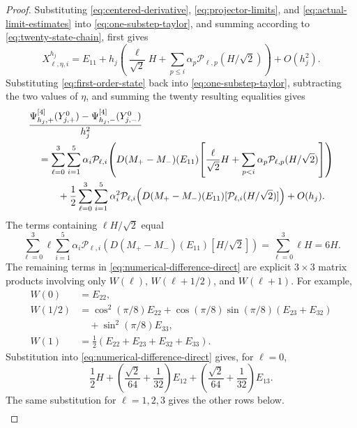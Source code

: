 \documentclass[10pt,a4paper]{amsart}
\numberwithin{equation}{section}
\begin{document}
\begin{proof}
Substituting \eqref{eq:centered-derivative},
\eqref{eq:projector-limits}, and \eqref{eq:actual-limit-estimates} into
\eqref{eq:one-substep-taylor}, and summing according to
\eqref{eq:twenty-state-chain}, first gives
\begin{equation}\label{eq:first-order-state}
 X^{h_j}_{\ell,\eta,i}
 =E_{11}+h_j\left(
 \frac{\ell}{\sqrt2}H
 +\sum_{p\le i}\alpha_p\mathcal P_{\ell,p}(H/\sqrt2)
 \right)+O(h_j^2).
\end{equation}
Substituting \eqref{eq:first-order-state} back into
\eqref{eq:one-substep-taylor}, subtracting the two values of $\eta$,
and summing the twenty resulting equalities gives
\begin{align}
 &\frac{\Psi^{[4]}_{h_j,+}(Y_{j,+}^0)-\Psi^{[4]}_{h_j,-}(Y_{j,-}^0)}{h_j^2}
 \notag\\
 &\quad=
 \sum_{\ell=0}^3\sum_{i=1}^5
 \alpha_i\mathcal P_{\ell,i}\!\left(
 D(M_+-M_-)(E_{11})\!\left[
 \frac{\ell}{\sqrt2}H
 +
   \sum_{p<i}\alpha_p\mathcal P_{\ell,p}(H/\sqrt2)
 \right]\right)
 \notag\\
 &\qquad\quad+\frac12
 \sum_{\ell=0}^3\sum_{i=1}^5\alpha_i^2
 \mathcal P_{\ell,i}\!\left(
 D(M_+-M_-)(E_{11})
 [\mathcal P_{\ell,i}(H/\sqrt2)]\right)+O(h_j).
 \label{eq:numerical-difference-direct}
\end{align}
The terms containing $\ell H/\sqrt2$ equal
\begin{equation}\label{eq:previous-step-sum}
 \sum_{\ell=0}^3\ell
 \sum_{i=1}^5\alpha_i\mathcal P_{\ell,i}\!\left(
 D(M_+-M_-)(E_{11})[H/\sqrt2]\right)
 =\sum_{\ell=0}^3\ell H=6H.
\end{equation}
The remaining terms in \eqref{eq:numerical-difference-direct} are
explicit $3\times3$ matrix products involving only $W(\ell)$,
$W(\ell+1/2)$, and $W(\ell+1)$.  For example,
\begin{align*}
 W(0)&=E_{22},\\
 W(1/2)&=\cos^2(\pi/8)E_{22}
 +\cos(\pi/8)\sin(\pi/8)(E_{23}+E_{32})\\
 &\quad+\sin^2(\pi/8)E_{33},\\
 W(1)&=\tfrac12(E_{22}+E_{23}+E_{32}+E_{33}).
\end{align*}
Substitution into \eqref{eq:numerical-difference-direct} gives, for
$\ell=0$,
\[
 \frac12H+\left(\frac{\sqrt2}{64}+\frac1{32}\right)E_{12}
 +\left(\frac{\sqrt2}{64}+\frac1{32}\right)E_{13}.
\]
The same substitution for $\ell=1,2,3$ gives the other rows below.
\begin{equation}\label{eq:within-step-table}
\begin{array}{c|l}

\end{array}
\end{equation}
\end{proof}
\end{document}
